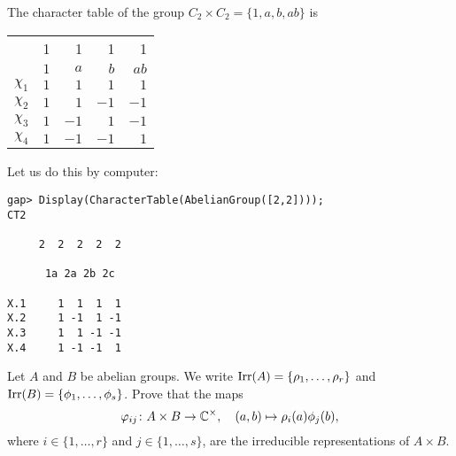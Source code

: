 \begin{example}
	The character table of the group $C_2\times C_2=\{1,a,b,ab\}$ is 
	\begin{center}
		\begin{tabular}{|c|rrrr|}
			\hline 
			& 1 & 1 & 1 & 1\tabularnewline
			& $1$ & $a$ & $b$ & $ab$\tabularnewline
			\hline 
			$\chi_{1}$ & $1$ & $1$ & $1$ & $1$\tabularnewline
			$\chi_{2}$ & $1$ & $1$ & $-1$ & $-1$\tabularnewline
			$\chi_{3}$ & $1$ & $-1$ & $1$ & $-1$\tabularnewline
			$\chi_{4}$ & $1$ & $-1$ & $-1$ & $1$\tabularnewline
			\hline
		\end{tabular}
	\end{center}
	Let us do this by computer:
\begin{lstlisting}
gap> Display(CharacterTable(AbelianGroup([2,2])));
CT2

     2  2  2  2  2

      1a 2a 2b 2c

X.1     1  1  1  1
X.2     1 -1  1 -1
X.3     1  1 -1 -1
X.4     1 -1 -1  1
\end{lstlisting}
%
%
%               
%               
\end{example}

\begin{exercise}
    Let $A$ and $B$ be abelian groups. 
    We write $\operatorname{Irr}(A)=\{\rho_1,\dots,\rho_r\}$ and 
    $\operatorname{Irr}(B)=\{\phi_1,\dots,\phi_s\}$. Prove
    that the maps 
    \[
    \varphi_{ij}\colon A\times B\to\mathbb{C}^\times,\quad
    (a,b)\mapsto\rho_i(a)\phi_j(b),
    \]
    where $i\in\{1,\dots,r\}$ and $j\in\{1,\dots,s\}$, are the irreducible representations of $A\times B$. 
\end{exercise}


